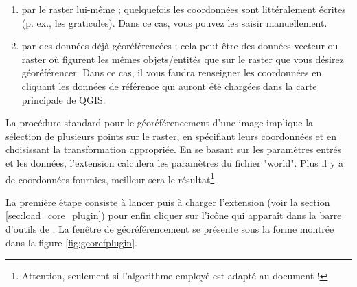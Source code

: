 
\begin{enumerate}
\item par le raster lui-même ; quelquefois les coordonnées sont littéralement écrites (p. ex., les graticules). Dans ce cas, vous pouvez les saisir manuellement.
\item par des données déjà géoréférencées ; cela peut être des données vecteur ou raster où figurent les mêmes objets/entités que sur le raster que vous désirez géoréférencer. Dans ce cas, il vous faudra renseigner les coordonnées en cliquant les données de référence qui auront été chargées dans la carte principale de QGIS.
\end{enumerate}


La procédure standard pour le géoréférencement d'une image implique la sélection de plusieurs points sur le raster, en spécifiant leurs coordonnées et en choisissant la transformation appropriée. En se basant sur les paramètres entrés et les données, l'extension calculera les paramètres du fichier "world". Plus il y a de coordonnées fournies, meilleur sera le résultat\footnote{Attention, seulement si l'algorithme employé est adapté au document !}.


La première étape consiste à lancer \qg puis à charger l'extension (voir la section \ref{sec:load_core_plugin}) pour enfin cliquer sur l'icône  qui apparaît dans la barre d'outils de \qg. La fenêtre de géoréférencement se présente sous la forme montrée dans la figure \ref{fig:georefplugin}.
 
